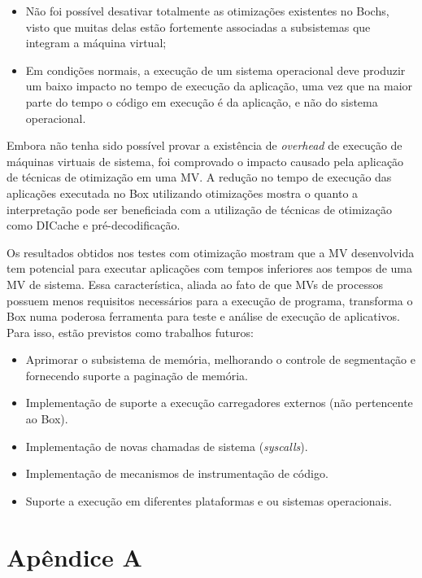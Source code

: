 \documentclass[11pt,twoside]{article}
\begin{document}
\begin{itemize}
 \item Não foi possível desativar totalmente as otimizações existentes no Bochs,
   visto que muitas delas estão fortemente associadas a subsistemas que integram
   a máquina virtual;
 \item Em condições normais, a execução de um sistema operacional deve produzir
   um baixo impacto no tempo de execução da aplicação, uma vez que na maior parte do tempo o código em execução é da aplicação, e não do sistema operacional.
\end{itemize}

Embora não tenha sido possível provar a existência de \emph{overhead} de
execução de máquinas virtuais de sistema, foi comprovado o impacto causado pela
aplicação de técnicas de otimização em uma MV. A redução no tempo
de execução das aplicações executada no Box utilizando otimizações mostra o
quanto a interpretação pode ser beneficiada com a utilização de técnicas de
otimização como DICache e pré-decodificação.

Os resultados obtidos nos testes com otimização mostram que a MV desenvolvida
tem potencial para executar aplicações com tempos inferiores aos tempos de uma
MV de sistema. Essa característica, aliada ao fato de que MVs de processos
possuem menos requisitos necessários para a execução de programa, transforma o
Box numa poderosa ferramenta para teste e análise de execução de
aplicativos. Para isso, estão previstos como trabalhos futuros:

\begin{itemize}
	\item Aprimorar o subsistema de memória, melhorando o controle de segmentação e fornecendo suporte a paginação de memória.
        \item Implementação de suporte a execução carregadores externos (não pertencente ao Box).
	\item Implementação de novas chamadas de sistema (\emph{syscalls}).
	\item Implementação de mecanismos de instrumentação de código.
	\item Suporte a execução em diferentes plataformas e ou sistemas operacionais.
\end{itemize}

\newpage

\section*{Apêndice A} \label{ap:results}
\end{document}
